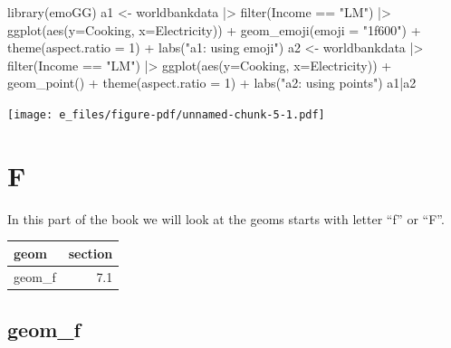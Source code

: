 \documentclass[
  letterpaper,
  DIV=11,
  numbers=noendperiod]{scrreprt}
\newenvironment{Shaded}{\begin{snugshade}}{\end{snugshade}}
\newcommand{\AttributeTok}[1]{\textcolor[rgb]{0.40,0.45,0.13}{#1}}
\newcommand{\DecValTok}[1]{\textcolor[rgb]{0.68,0.00,0.00}{#1}}
\newcommand{\FunctionTok}[1]{\textcolor[rgb]{0.28,0.35,0.67}{#1}}
\newcommand{\NormalTok}[1]{\textcolor[rgb]{0.00,0.23,0.31}{#1}}
\newcommand{\OtherTok}[1]{\textcolor[rgb]{0.00,0.23,0.31}{#1}}
\newcommand{\SpecialCharTok}[1]{\textcolor[rgb]{0.37,0.37,0.37}{#1}}
\newcommand{\StringTok}[1]{\textcolor[rgb]{0.13,0.47,0.30}{#1}}
\begin{document}
\begin{Shaded}
\begin{Highlighting}[]
\FunctionTok{library}\NormalTok{(emoGG)}
\NormalTok{a1 }\OtherTok{\textless{}{-}}\NormalTok{ worldbankdata }\SpecialCharTok{|\textgreater{}}
  \FunctionTok{filter}\NormalTok{(Income }\SpecialCharTok{==} \StringTok{"LM"}\NormalTok{) }\SpecialCharTok{|\textgreater{}}
\FunctionTok{ggplot}\NormalTok{(}\FunctionTok{aes}\NormalTok{(}\AttributeTok{y=}\NormalTok{Cooking, }\AttributeTok{x=}\NormalTok{Electricity)) }\SpecialCharTok{+}
  \FunctionTok{geom\_emoji}\NormalTok{(}\AttributeTok{emoji =} \StringTok{"1f600"}\NormalTok{) }\SpecialCharTok{+} 
   \FunctionTok{theme}\NormalTok{(}\AttributeTok{aspect.ratio =} \DecValTok{1}\NormalTok{) }\SpecialCharTok{+} \FunctionTok{labs}\NormalTok{(}\StringTok{"a1: using emoji"}\NormalTok{)}
\NormalTok{a2 }\OtherTok{\textless{}{-}}\NormalTok{ worldbankdata }\SpecialCharTok{|\textgreater{}}
  \FunctionTok{filter}\NormalTok{(Income }\SpecialCharTok{==} \StringTok{"LM"}\NormalTok{) }\SpecialCharTok{|\textgreater{}}
\FunctionTok{ggplot}\NormalTok{(}\FunctionTok{aes}\NormalTok{(}\AttributeTok{y=}\NormalTok{Cooking, }\AttributeTok{x=}\NormalTok{Electricity)) }\SpecialCharTok{+}
  \FunctionTok{geom\_point}\NormalTok{() }\SpecialCharTok{+} 
   \FunctionTok{theme}\NormalTok{(}\AttributeTok{aspect.ratio =} \DecValTok{1}\NormalTok{) }\SpecialCharTok{+} \FunctionTok{labs}\NormalTok{(}\StringTok{"a2: using points"}\NormalTok{)}
\NormalTok{a1}\SpecialCharTok{|}\NormalTok{a2}
\end{Highlighting}
\end{Shaded}

\texttt{[image: e\_files/figure-pdf/unnamed-chunk-5-1.pdf]}

\part{F}

In this part of the book we will look at the geoms starts with letter
``f'' or ``F''.

\begin{longtable}[]{@{}lr@{}}
\toprule\noalign{}
geom & section \\
\midrule\noalign{}
\endhead
\bottomrule\noalign{}
\endlastfoot
geom\_f & 7.1 \\
\end{longtable}

\chapter{geom\_f}\label{sec-f}
\end{document}
